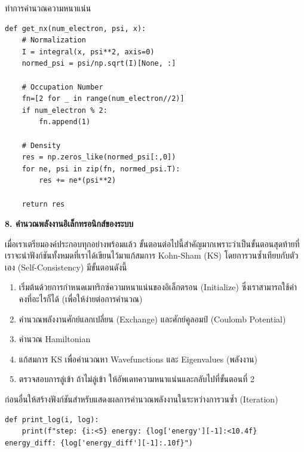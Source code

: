 \vspace{1em}
\noindent ทำการคำนวณความหนาแน่น

\begin{lstlisting}[style=MyPython]
def get_nx(num_electron, psi, x):
    # Normalization
    I = integral(x, psi**2, axis=0)
    normed_psi = psi/np.sqrt(I)[None, :]
    
    # Occupation Number
    fn=[2 for _ in range(num_electron//2)]
    if num_electron % 2:
        fn.append(1)

    # Density
    res = np.zeros_like(normed_psi[:,0])
    for ne, psi in zip(fn, normed_psi.T):
        res += ne*(psi**2)

    return res
\end{lstlisting}

\vspace{1em}
\noindent \textbf{8. คำนวณพลังงานอิเล็กทรอนิกส์ของระบบ}

เมื่อเราเตรียมองค์ประกอบทุกอย่างพร้อมแล้ว ขั้นตอนต่อไปนี้สำคัญมากเพราะว่าเป็นขั้นตอนสุดท้ายที่เราจะนำฟังก์ชันทั้งหมดที่เราได้เขียนไว้มาแก้สมการ
Kohn-Sham (KS) โดยการวนซ้ำเทียบกับตัวเอง (Self-Consistency) มีขั้นตอนดังนี้
%
\begin{enumerate}[topsep=0pt,noitemsep]\setlength\itemsep{0.5em}
    \item เริ่มต้นด้วยการกำหนดเมทริกซ์ความหนาแน่นของอิเล็กตรอน (Initialize) ซึ่งเราสามารถใช้ค่าคงที่อะไรก็ได้ (เพื่อให้ง่ายต่อการคำนวณ)

    \item คำนวณพลังงานศักย์แลกเปลี่ยน (Exchange) และศักย์คูลอมป์ (Coulomb Potential)

    \item คำนวณ Hamiltonian

    \item แก้สมการ KS เพื่อคำนวณหา Wavefunctions และ Eigenvalues (พลังงาน)

    \item ตรวจสอบการลู่เข้า ถ้าไม่ลู่เข้า ให้อัพเดทความหนาแน่นและกลับไปที่ขั้นตอนที่ 2
\end{enumerate}

ก่อนอื่นให้สร้างฟังก์ชันสำหรับแสดงผลการคำนวณพลังงานในระหว่างการวนซ้ำ (Iteration)

\begin{lstlisting}[style=MyPython]
def print_log(i, log):
    print(f"step: {i:<5} energy: {log['energy'][-1]:<10.4f} energy_diff: {log['energy_diff'][-1]:.10f}")
\end{lstlisting}

\vspace{1em}

